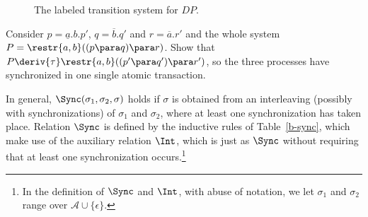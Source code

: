 \begin{figure}[t]
\centering

\caption{The labeled transition system for $DP$.}
\label{ltsdining}
\end{figure}

\begin{exercise}\label{multi-sync-exer}
Consider $p = \underline{a}.b.p'$,
$q = \overline{b}.q'$ and $r = \overline{a}.r'$ and the whole system $P = \restr{a,b}((p \para q) \para r)$. Show
that $P \deriv{\tau} \restr{a,b}((p' \para q') \para r')$, so the three processes 
have synchronized in one single atomic transaction.
\fine
\end{exercise}


In general, $\Sync(\sigma_1, \sigma_2, \sigma)$ holds
if $\sigma$ is obtained from an interleaving (possibly with synchronizations) of $\sigma_1$ and $\sigma_2$, 
where at least one synchronization has taken place. 
Relation $\Sync$ is defined by the inductive rules of Table~\ref{b-sync}, which make use of the auxiliary
relation $\Int$, which is just as $\Sync$ without requiring that at least one synchronization occurs.\footnote{In the definition 
of $\Sync$ and $\Int$, with abuse of notation, we let $\sigma_1$ and $\sigma_2$ range over $\mathcal{A} \cup \{\epsilon\}$.}




